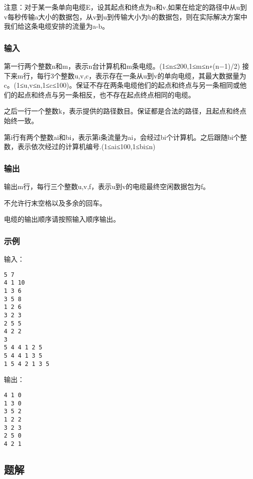 注意：对于某一条单向电缆E，设其起点和终点为u和v,如果在给定的路径中从u到v每秒传输a大小的数据包，从v到u到传输大小为b的数据包，则在实际解决方案中我们给这条电缆安排的流量为a-b。

\subsubsection{输入}
第一行两个整数n和m，表示n台计算机和m条电缆。(1≤n≤200,1≤m≤n∗(n−1)/2)
接下来m行，每行3个整数u,v,c，表示存在一条从u到v的单向电缆，其最大数据量为c。(1≤u,v≤n,1≤c≤100)。保证不存在两条电缆他们的起点和终点与另一条相同或他们的起点和终点与另一条相反，也不存在起点终点相同的电缆。

之后一行一个整数k，表示提供的路径数目。保证都是合法的路径，且起点和终点始终一致。

第i行有两个整数ai和bi，表示第i条流量为ai，会经过bi个计算机。之后跟随bi个整数，表示依次经过的计算机编号.(1≤ai≤100,1≤bi≤n)

\subsubsection{输出}
输出m行，每行三个整数u,v,f，表示u到v的电缆最终空闲数据包为f。

不允许行末空格以及多余的回车。

电缆的输出顺序请按照输入顺序输出。

\subsubsection{示例}
输入：
\begin{lstlisting}
5 7
4 1 10
1 3 6
3 5 8
1 2 6
3 2 3
2 5 5
4 2 2
3
5 4 4 1 2 5
5 4 4 1 3 5
1 5 4 2 1 3 5
\end{lstlisting}

输出：
\begin{lstlisting}
4 1 0
1 3 0
3 5 2
1 2 2
3 2 3
2 5 0
4 2 1
\end{lstlisting}

\subsection{题解}


